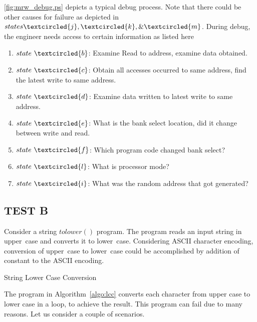 \figurename{\ref{fig:mrw_debug.ps}} depicts a typical debug process. Note that there could be other causes for failure as depicted in $states \textcircled{j}, \textcircled{k}, \& \textcircled{m}$. During debug, the engineer needs access to certain information as listed here
\begin{enumerate}
\item $state~\textcircled{b}$: Examine Read to address, examine data obtained.
\item $state~\textcircled{c}$: Obtain all accesses occurred to same address, find the latest write to same address.
\item $state~\textcircled{d}$: Examine data written to latest write to same address.
\item $state~\textcircled{e}$: What is the bank select location, did it change between write and read.
\item $state~\textcircled{f}$: Which program code changed bank select?
\item $state~\textcircled{l}$: What is processor mode?
\item $state~\textcircled{i}$: What was the random address that got generated?
\end{enumerate}

\subsection {TEST B}
\label{case:testb}
Consider a string $tolower()$ program. The program reads an input string in upper~case and converts it to lower~case. Considering ASCII character encoding, conversion of upper~case to lower~case could be accomplished by addition of constant to the ASCII encoding.



\IncMargin{1em}
\begin{algorithm}[h]
\DontPrintSemicolon
{}

\BlankLine
 \;

\caption{String Lower Case Conversion}
\label{algo:lcc}
\end{algorithm}\DecMargin{1em}


The program in Algorithm~\ref{algo:lcc} converts each character from upper case to lower case in a loop, to achieve the result. This program can fail due to many reasons. Let us consider a couple of scenarios.

